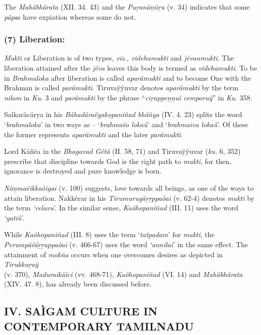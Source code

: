 The \textit{Mahäbhärata} (XII. 34. 43) and the \textit{Puṟanäṉüṟu} (v. 34) indicates that some \textit{päpa}s have expiation whereas some do not.


\subsubsection*{(7) Liberation:}

\textit{Mukti} or Liberation is of two types, \textit{viz., videhamukti} and \textit{jévanmukti}. The liberation attained after the \textit{jéva} leaves this body is termed as \textit{videhamukti}. To be in \textit{Brahmaloka} after liberation is called \textit{aparämukti} and to become One with the Brahman is called \textit{parämukti}. Tiruvaÿÿuvar denotes \textit{aparämukti} by the term \textit{nilam} in \textit{Ku.} 3 and \textit{parämukti} by the phrase “\textit{ciṟappeṉṉuï cemporuÿ}” in \textit{Ku.} 358.

Saìkaräcärya in his \textit{Båhadäraëyakopaniñad bhäñya} (IV. 4. 23) splits the word ‘\textit{brahmaloka}’ in two ways as – ‘\textit{brahmaëo lokaù}’ and ‘\textit{brahmaiva lokaù}’. Of these the former represents \textit{aparämukti} and the later \textit{parämukti}.

Lord Kåñëa in the \textit{Bhagavad Gétä} (II. 58, 71) and Tiruvaÿÿuvar (\textit{ku.} 6, 352) prescribe that discipline towards God is the right path to \textit{mukti}, for then, ignorance is destroyed and pure knowledge is born.

\textit{Näṉmaëikkaòigai} (v. 100) suggests, love towards all beings, as one of the ways to attain liberation. Nakkérar in his \textit{Tirumurugäṟṟppaòai} (v. 62-4) denotes \textit{mukti} by the term \textit{‘celavu}’. In the similar sense, \textit{Kaöhopaniñad} (III. 11) uses the word \textit{‘gatiù}’.

While \textit{Kaöhopaniñad} (III. 8) uses the term ‘\textit{tatpadam}’ for \textit{mukti}, the \textit{Perumpäëäṟṟuppaòai} (v. 466-67) uses the word \textit{‘annilai}’ in the same effect. The attainment of \textit{mokña} occurs when one overcomes desires as depicted in \textit{Tirukkuṟaÿ} \\(v. 370), \textit{Maduraikäïci} (vv. 468-71), \textit{Kaöhopaniñad} (VI. 14) and \textit{Mahäbhärata} (XIV. 47. 8), has already been discussed before.


\subsection*{IV. SAÌGAM CULTURE IN CONTEMPORARY TAMILNADU}

